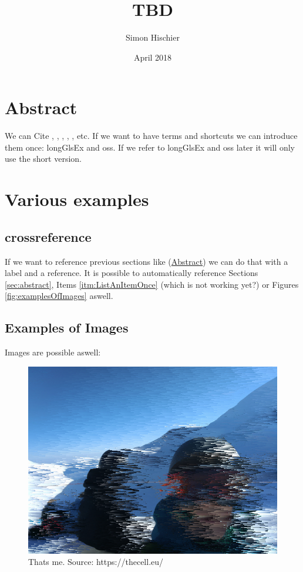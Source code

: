 \documentclass[10pt,a4paper]{article}
\title{TBD}
\author{Simon Hischier}
\date{April 2018}
\begin{document}



\renewcommand{\contentsname}{Inhalt}
\tableofcontents
\newpage

\section{Abstract}
\label{sec:abstract}
We can Cite \cite{wikipediaScriptingLanguage}, \cite{Iivari2008usabilityInCompanyOSS}, \cite{almarzouq2005open}, \cite{heiseonline2017limuxservus}, \cite{viorres2007major}, \cite{wikipediaScriptingLanguage} etc. If we want to have terms and shortcuts we can introduce them once: \gls{longGlsEx} and \gls{oss}. If we refer to \gls{longGlsEx} and \gls{oss} later it will only use the short version.

\section{Various examples}
\subsection{crossreference}
If we want to reference previous sections like (\hyperref[sec:abstract]{Abstract}) we can do that with a label and a reference. It is possible to automatically reference Sections \autoref{sec:abstract}, Items \autoref{itm:ListAnItemOnce} (which is not working yet?) or Figures \autoref{fig:examplesOfImages} aswell.
\subsection{Examples of Images}
Images are possible aswell:
\begin{figure}[H]
	\includegraphics[width=\textwidth, height=\textheight, keepaspectratio]{example1.png}
	\caption{Thats me. Source: {https://thecell.eu/}}
	\label{fig:examplesOfImages}
\end{figure}
\end{document}
